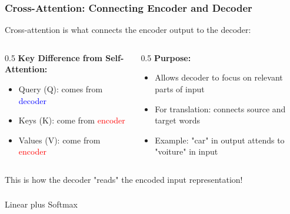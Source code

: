 \begin{frame}[fragile]\frametitle{Cross-Attention: Connecting Encoder and Decoder}

Cross-attention is what connects the encoder output to the decoder:

\begin{columns}
  \begin{column}[T]{0.5\linewidth}
    \textbf{Key Difference from Self-Attention:}
    \begin{itemize}
    \item Query (Q): comes from \textcolor{blue}{decoder}
    \item Keys (K): come from \textcolor{red}{encoder}
    \item Values (V): come from \textcolor{red}{encoder}
    \end{itemize}
  \end{column}
  \begin{column}[T]{0.5\linewidth}
    \textbf{Purpose:}
    \begin{itemize}
    \item Allows decoder to focus on relevant parts of input
    \item For translation: connects source and target words
    \item Example: "car" in output attends to "voiture" in input
    \end{itemize}
  \end{column}
\end{columns}

\vspace{0.3cm}
This is how the decoder "reads" the encoded input representation!
\end{frame}

\begin{frame}[fragile]\frametitle{}
\begin{center}
{\Large Linear plus Softmax}
\end{center}
\end{frame}

